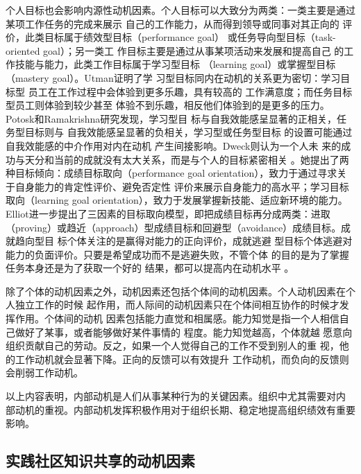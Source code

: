 \documentclass[12pt,a4paper,cs4size]{ctexart}
\begin{document}
个人目标也会影响内源性动机因素。个人目标可以大致分为两类：一类主要是通过某项工作任务的完成来展示
自己的工作能力，从而得到领导或同事对其正向的
评价，此类目标属于绩效型目标（performance goal）
或任务导向型目标（task-oriented goal）；另一类工
作目标主要是通过从事某项活动来发展和提高自己
的工作技能与能力，此类工作目标属于学习型目标
（learning goal）或掌握型目标（mastery
goal）\cite{LairdJRawsthorne11011999}\cite{Pajares2000}。Utman证明了学
习型目标同内在动机的关系更为密切：学习目标型
员工在工作过程中会体验到更多乐趣，具有较高的
工作满意度；而任务目标型员工则体验到较少甚至
体验不到乐趣，相反他们体验到的是更多的压力\cite{ChristopherHUtman05011997}。Potosk和Ramakrishna研究发现，学习型目
标与自我效能感呈显著的正相关，任务型目标则与
自我效能感呈显著的负相关，学习型或任务型目标
的设置可能通过自我效能感的中介作用对内在动机
产生间接影响\cite{potosky2002mru}。Dweck则认为一个人未
来的成功与天分和当前的成就没有太大关系，而是与个人的目标紧密相关
\cite{dweck2000stt}。她提出了两种目标倾向：成绩目标取向（performance
goal orientation），致力于通过寻求关于自身能力的肯定性评价、避免否定性
评价来展示自身能力的高水平；学习目标取向（learning goal
orientation），致力于发展掌握新技能、适应新环境的能力。Elliot进一步提出了三因素的目标取向模型，即把成绩目标再分成两类：进取（proving）或趋近（approach）型成绩目标和回避型（avoidance）成绩目标\cite{elliot1996aaa}。成就趋向型目
标个体关注的是赢得对能力的正向评价，成就逃避
型目标个体逃避对能力的负面评价。只要是希望成功而不是逃避失败，不管个体
的目的是为了掌握任务本身还是为了获取一个好的
结果，都可以提高内在动机水平 。

除了个体的动机因素之外，动机因素还包括个体间的动机因素\cite{Hackman1975}\cite{Hackman1980}。个人动机因素在个人独立工作的时候
起作用，而人际间的动机因素只在个体间相互协作的时候才发挥作用。个体间的动机
因素包括能力直觉和相属感。能力知觉是指一个人相信自己做好了某事，或者能够做好某件事情的
程度\cite{harter1981nsr}\cite{bandura1982sem}。能力知觉越高，个体就越
愿意向组织贡献自己的劳动。反之，如果一个人觉得自己的工作不受到别人的重
视，他的工作动机就会显著下降\cite{Hertel2003}。正向的反馈可以有效提升
工作动机，而负向的反馈则会削弱工作动机。

以上内容表明，内部动机是人们从事某种行为的关键因素。组织中尤其需要对内
部动机的重视。内部动机发挥积极作用对于组织长期、稳定地提高组织绩效有重要
影响。


\subsection{实践社区知识共享的动机因素}
\end{document}
